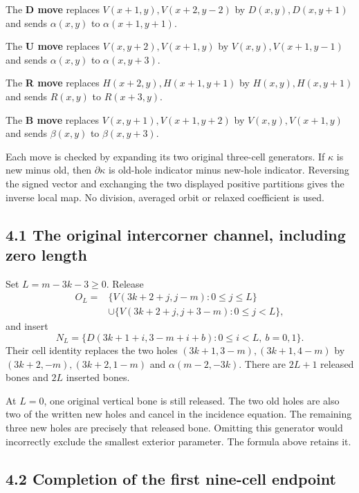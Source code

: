 The \textbf{D move} replaces \(V(x+1,y),V(x+2,y-2)\) by
\(D(x,y),D(x,y+1)\) and sends \(\alpha(x,y)\) to \(\alpha(x+1,y+1)\).

The \textbf{U move} replaces \(V(x,y+2),V(x+1,y)\) by
\(V(x,y),V(x+1,y-1)\) and sends \(\alpha(x,y)\) to \(\alpha(x,y+3)\).

The \textbf{R move} replaces \(H(x+2,y),H(x+1,y+1)\) by
\(H(x,y),H(x,y+1)\) and sends \(R(x,y)\) to \(R(x+3,y)\).

The \textbf{B move} replaces \(V(x,y+1),V(x+1,y+2)\) by
\(V(x,y),V(x+1,y)\) and sends \(\beta(x,y)\) to \(\beta(x,y+3)\).

Each move is checked by expanding its two original three-cell
generators. If \(\kappa\) is new minus old, then \(\partial\kappa\) is
old-hole indicator minus new-hole indicator. Reversing the signed vector
and exchanging the two displayed positive partitions gives the inverse
local map. No division, averaged orbit or relaxed coefficient is used.

\subsection{4.1 The original intercorner channel, including zero
length}\label{the-original-intercorner-channel-including-zero-length}

Set \(L=m-3k-3\ge0\). Release \[
\begin{aligned}
O_L={}&\{V(3k+2+j,j-m):0\le j\le L\}\\
 &\cup\{V(3k+2+j,j+3-m):0\le j<L\},
\end{aligned}
\] and insert \[
N_L=\{D(3k+1+i,3-m+i+b):0\le i<L,\ b=0,1\}.
\] Their cell identity replaces the two holes \((3k+1,3-m),(3k+1,4-m)\)
by \((3k+2,-m),(3k+2,1-m)\) and \(\alpha(m-2,-3k)\). There are \(2L+1\)
released bones and \(2L\) inserted bones.

At \(L=0\), one original vertical bone is still released. The two old
holes are also two of the written new holes and cancel in the incidence
equation. The remaining three new holes are precisely that released
bone. Omitting this generator would incorrectly exclude the smallest
exterior parameter. The formula above retains it.

\subsection{4.2 Completion of the first nine-cell
endpoint}\label{completion-of-the-first-nine-cell-endpoint}


